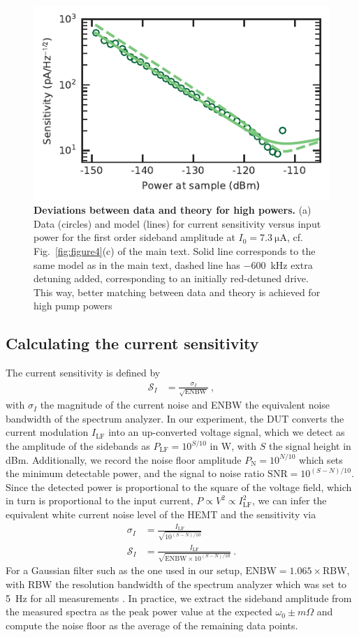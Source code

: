 \begin{figure}
	\centering
	\includegraphics[width=.5\linewidth]{chapter-currentdetection/figures/SM_Pin_detuning}
	\caption{
		\textbf{Deviations between data and theory for high powers.}
		(a) Data (circles) and model (lines) for current sensitivity versus input power for the first order sideband amplitude at $I_0=\SI{7.3}{\micro\ampere}$, cf. Fig.~\ref{fig:figure4}(c) of the main text.
		Solid line corresponds to the same model as in the main text, dashed line has \SI{-600}{\kilo\hertz} extra detuning added, corresponding to an initially red-detuned drive.
		This way, better matching between data and theory is achieved for high pump powers
	}
	\label{fig:deviation_power}
\end{figure}


\subsection{Calculating the current sensitivity}\label{sec:analysis}

% 
The current sensitivity is defined by
% 
\begin{align}
\mathcal{S}_I & = \frac{\sigma_I}{\sqrt{\text{ENBW}}}\ ,
\end{align}
% 
with $\sigma_I$ the magnitude of the current noise and ENBW the equivalent noise bandwidth of the spectrum analyzer.
% 
In our experiment, the DUT converts the current modulation $I_\text{LF}$ into an up-converted voltage signal, which we detect as the amplitude of the sidebands as $P_\text{LF}=10^{S/10}$ in \si{\watt}, with $S$ the signal height in \si{dBm}.
% 
Additionally, we record the noise floor amplitude $P_\text{N}=10^{N/10}$ which sets the minimum detectable power, and the signal to noise ratio $\text{SNR}=10^{(S-N)/10}$.
% 
Since the detected power is proportional to the square of the voltage field, which in turn is proportional to the input current, $P \propto V^2 \propto I_\text{LF}^2$, we can infer the equivalent white current noise level of the HEMT and the sensitivity via
% 
\begin{align}
\sigma_I &= \frac{I_\text{LF}}{\sqrt{10^{(S-N)/10}}} \\
\mathcal{S}_I &= \frac{I_\text{LF}}{\sqrt{\text{ENBW}\times10^{(S-N)/10}}}\ .
\end{align}
% 
For a Gaussian filter such as the one used in our setup, $\text{ENBW}=1.065 \times \text{RBW}$, with RBW the resolution bandwidth of the spectrum analyzer which was set to \SI{5}{\hertz} for all measurements \cite{rauscherFundamentalsSpectrumAnalysis2016}.
% 
In practice, we extract the sideband amplitude from the measured spectra as the peak power value at the expected $\omega_0 \pm m\Omega$ and compute the noise floor as the average of the remaining data points.

